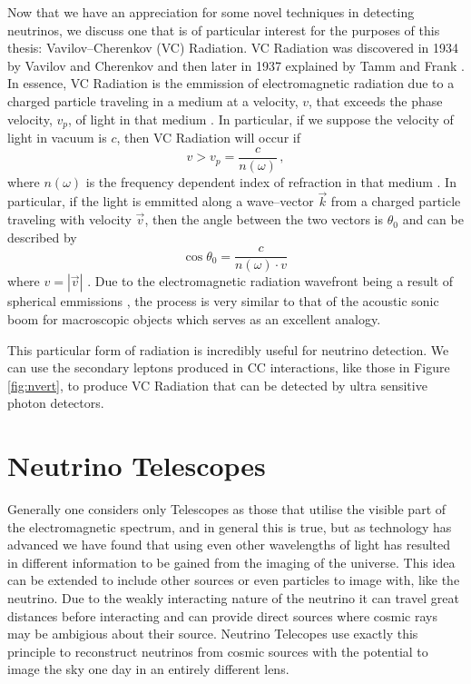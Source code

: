Now that we have an appreciation for some novel techniques in detecting neutrinos, we discuss one that is of particular interest for the purposes of this thesis: Vavilov--Cherenkov (VC) Radiation. VC Radiation was discovered in 1934 by Vavilov \cite{vav_og} and Cherenkov \cite{cher_og} and then later in 1937 explained by Tamm and Frank \cite{tamm}. In essence, VC Radiation is the emmission of electromagnetic radiation due to a charged particle traveling in a medium at a velocity, $v$, that exceeds the phase velocity, $v_{p}$, of light in that medium \cite{ginz}. In particular, if we suppose the velocity of light in vacuum is $c$, then VC Radiation will occur if
\begin{equation}
  v > v_{p} = \frac{c}{n(\omega)}\, ,
\end{equation}
where $n(\omega)$ is the frequency dependent index of refraction in that medium \cite{ginz}. In particular, if the light is emmitted along a wave--vector $\vec{k}$ from a charged particle traveling with velocity $\vec{v}$, then the angle between the two vectors is $\theta_{0}$ and can be described by
\begin{equation}\label{fig:cher_angle}
  \cos\theta_{0} = \frac{c}{n(\omega)\cdot v}\,
\end{equation}
where $v = |\vec{v}|$ \cite{ginz}. Due to the electromagnetic radiation wavefront being a result of spherical emmissions \cite{ginz}, the process is very similar to that of the acoustic sonic boom for macroscopic objects \cite{ginz} which serves as an excellent analogy.

This particular form of radiation is incredibly useful for neutrino detection. We can use the secondary leptons produced in CC interactions, like those in Figure \ref{fig:nvert}, to produce VC Radiation that can be detected by ultra sensitive photon detectors. 

\section{Neutrino Telescopes}

Generally one considers only Telescopes as those that utilise the visible part of the electromagnetic spectrum, and in general this is true, but as technology has advanced we have found that using even other wavelengths of light has resulted in different information to be gained from the imaging of the universe. This idea can be extended to include other sources or even particles to image with, like the neutrino. Due to the weakly interacting nature of the neutrino it can travel great distances before interacting and can provide direct sources where cosmic rays may be ambigious about their source. Neutrino Telecopes use exactly this principle to reconstruct neutrinos from cosmic sources with the potential to image the sky one day in an entirely different lens.


